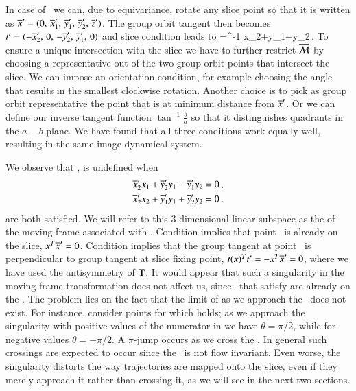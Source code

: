 In case of \cLe\ we can, due to equivariance, rotate any slice point so that it is written as
${\overline{x}'}=(0,\,{\overline{x}'_{1}},\,{\overline{y}'_{1}},\,{\overline{y}'_{2}},\,{\overline{z}'_{}})$.
The group orbit tangent then becomes
$t'_{}=(-{\overline{x}'_{2}},\,0,\,-{\overline{y}'_{2}},\,{\overline{y}'_{1}},\,0)$
and slice condition  leads to
\beq
  \theta=\tan^{-1}
			  {x_2+y_1+y_2}\,.
To ensure a unique intersection with the slice we have to further restrict $\pSRed$
by choosing a representative out of the two group orbit points that intersect the slice.
We can impose an orientation condition, for example choosing the angle that
results in the smallest clockwise rotation. Another choice is to pick as group
orbit representative the point that is at minimum distance from $\slicep$. Or we
can define our inverse tangent function $\tan^{-1}\frac{b}{a}$ so that it distinguishes quadrants
in the $a-b$ plane.
We have found that all three conditions work equally well, resulting in the same image dynamical
system.

We observe that , is undefined when
\begin{subequations}\label{cLeMFsing}
  \begin{align}
    \slicepComp{x}{2}x_1+\slicepComp{y}{2}y_1-\slicepComp{y}{1}y_2 &=0 \label{cLeMFsingOnSlice}\cont
    \slicepComp{x}{2}x_2+\slicepComp{y}{1}y_1+\slicepComp{y}{2}y_2 &=0 \label{cLeMFsingPerpTan}\,.
  \end{align}
\end{subequations}
are both satisfied. We will refer to this $3$-dimensional linear subspace as the \emph{\sset} of the moving
frame associated with . Condition  implies that point \ssp\ is already
on the slice, $x^T{\overline{x}'}=0$. Condition  implies that the group tangent
at point \ssp\ is perpendicular to group tangent at slice fixing point,
$t{}(x)^Tt'_{}=-x^T{\overline{x}'}=0$, where we have used the antisymmetry of $\mathbf{T}$.
It would appear that such a singularity in the moving frame transformation does not affect us,
since \ssp\ that satisfy  are already on the \slice. The problem lies on the fact
that the limit of  as we approach the \sset\ does not exist.
For instance, consider points for which 
holds; as we approach the singularity with positive values of the numerator in 
we have $\theta=\pi/2$, while for negative values $\theta=-\pi/2$. A $\pi$-jump occurs as
we cross the \sset. In general such crossings are expected to occur since the \sset\ is not
flow invariant. Even worse, the singularity distorts the way trajectories
are mapped onto the slice, even if they merely approach it rather than crossing it, as we
will see in the next two sections.


